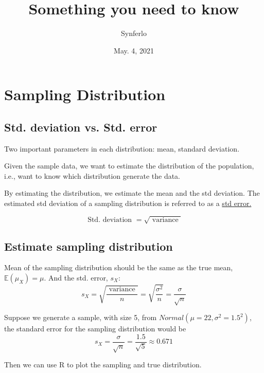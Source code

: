 \documentclass[12pt]{article}
\title{Something you need to know}
\author{Synferlo}
\date{May. 4, 2021}
\begin{document}
\maketitle
\newpage





\section{Sampling Distribution}

\subsection{Std. deviation vs. Std. error}
Two important parameters in each distribution: mean, standard deviation.

Given the sample data, we want to estimate the distribution of the 
population, i.e., want to know which distribution generate the data.

By estimating the distribution, we estimate the mean and the std 
deviation. The estimated std deviation of a sampling distribution is
referred to as a {\underline {std error.}}

\begin{equation*}
\text{ Std. deviation } = \sqrt {\text{ variance }}
\end{equation*}


\subsection{Estimate sampling distribution}
Mean of the sampling distribution should be the same as the true mean,
$ \mathbb{E}(\mu_{X}) = \mu $. And the std. error, $ s_{X} $:
\begin{equation*}
s_{X} = \sqrt { \frac{\text{ variance }}{n}} = 
\sqrt { \frac{\sigma^{2}}{n}} = \frac{\sigma}{\sqrt {n}}
\end{equation*}



Suppose we generate a sample, with size 5, 
from $ Normal(\mu = 22, \sigma^{2} = 1.5^{2}) $,
the standard error for the sampling distribution would be
\begin{equation*}
s_{X} = \frac{\sigma}{\sqrt {n}} = \frac{1.5}{\sqrt {5}} \approx 0.671
\end{equation*}

Then we can use R to plot the sampling and true distribution.
\end{document}
